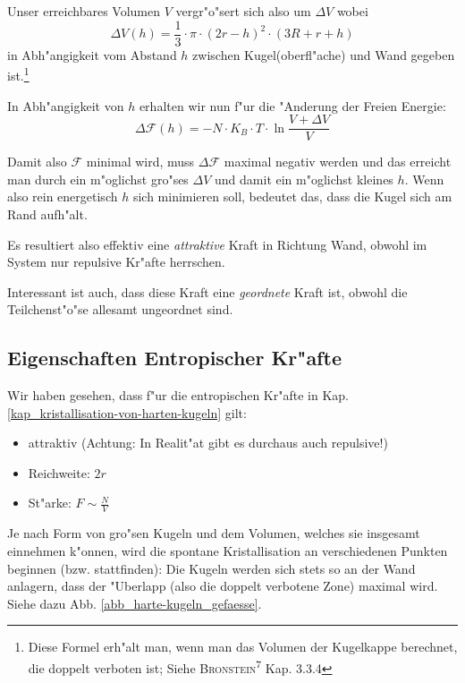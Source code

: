 Unser erreichbares Volumen $V$ vergr"o"sert sich also um $\Delta V$
wobei 
\begin{equation}
   \label{eqn_differenz-c5}
   \Delta V (h) = \frac{1}{3} \cdot \pi \cdot (2r - h)^2 \cdot (3R + r
   + h)
\end{equation}
in Abh"angigkeit vom Abstand $h$ zwischen Kugel(oberfl"ache) und Wand
gegeben ist.\footnote{Diese Formel erh"alt man, wenn man das Volumen
  der Kugelkappe berechnet, die doppelt verboten ist; Siehe
  \textsc{Bronstein}\textsuperscript{7} Kap. 3.3.4}

In Abh"angigkeit von $h$ erhalten wir nun f"ur die "Anderung der Freien
Energie:
\begin{equation}
   \label{eqn_differenz-c6}
   \Delta \mathcal F(h) = -N \cdot K_B \cdot T \cdot \ln \frac{V + \Delta V}{V}
\end{equation}

Damit also $\mathcal F$ minimal wird, muss $\Delta \mathcal{F}$
maximal negativ werden und das erreicht man durch ein m"oglichst gro"ses
$\Delta V$ und damit ein m"oglichst kleines $h$. Wenn also rein
energetisch $h$ sich minimieren soll, bedeutet das, dass die Kugel
sich am Rand aufh"alt. 

\begin{Wichtig}
   Es resultiert also effektiv eine \emph{attraktive} Kraft in
   Richtung Wand, obwohl im System nur repulsive Kr"afte herrschen.
\end{Wichtig}
Interessant ist auch, dass diese Kraft eine \emph{geordnete} Kraft
ist, obwohl die Teilchenst"o"se allesamt ungeordnet sind.





\subsection{Eigenschaften Entropischer Kr"afte}
\label{kap_eigenschaften-entropischer-krafte}

Wir haben gesehen, dass f"ur die entropischen Kr"afte in
Kap. \ref{kap_kristallisation-von-harten-kugeln} gilt:
\begin{itemize}
\item attraktiv (Achtung: In Realit"at gibt es durchaus auch repulsive!)
\item Reichweite: $2r$
\item St"arke: $F \sim \frac{N}{V}$
\end{itemize}

Je nach Form von gro"sen Kugeln und dem Volumen, welches sie insgesamt
einnehmen k"onnen, wird die spontane Kristallisation an verschiedenen
Punkten beginnen (bzw. stattfinden): Die Kugeln werden sich stets so
an der Wand anlagern, dass der "Uberlapp (also die doppelt verbotene
Zone) maximal wird. Siehe dazu Abb. \ref{abb_harte-kugeln_gefaesse}.

